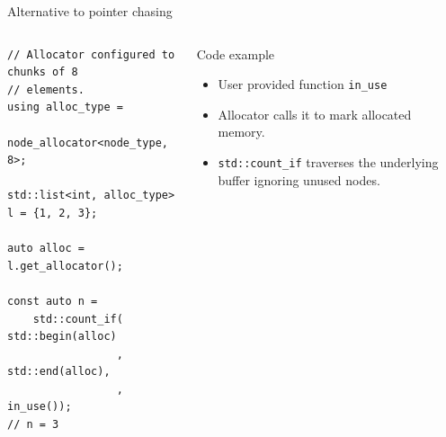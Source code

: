 \documentclass[10pt,aspectratio=169]{beamer}
\begin{document}
\begin{frame}[fragile]
{Alternative to pointer chasing}
\begin{columns}
\begin{column}{0.47\textwidth}
\begin{lstlisting}
// Allocator configured to chunks of 8
// elements.
using alloc_type =
    node_allocator<node_type, 8>;

std::list<int, alloc_type> l = {1, 2, 3};

auto alloc = l.get_allocator();

const auto n =
    std::count_if( std::begin(alloc)
                 , std::end(alloc),
                 , in_use());
// n = 3
\end{lstlisting}

\end{column}
\begin{column}{0.47\textwidth}
\begin{block} {Code example}
\begin{itemize}
\item User provided function \texttt{in\_use}
\item Allocator calls it to mark allocated memory.
\item \texttt{std::count\_if} traverses the underlying buffer
ignoring unused nodes.
\end{itemize}
\end{block}
\end{column}
\end{columns}
\end{frame}
\end{document}
